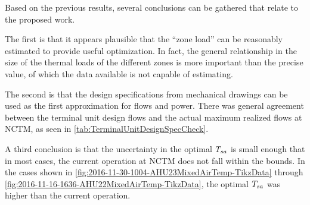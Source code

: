 Based on the previous results, several conclusions can be gathered that
relate to the proposed work.

The first is that it appears plausible that the ``zone load'' can be
reasonably estimated to provide useful optimization.  In fact, the
general relationship in the size of the thermal loads of the different
zones is more important than the precise value, of which the data
available is not capable of estimating. 

The second is that the design specifications from mechanical drawings
can be used as the first approximation for flows and power.  There was
general agreement between the terminal unit design flows and the actual
maximum realized flows at NCTM, as seen in \tableref{}
\ref{tab:TerminalUnitDesignSpecCheck}. 

A third conclusion is that the uncertainty in the optimal \(T_{sa}\) is
small enough that in most cases, the current operation at NCTM does not
fall within the bounds.  In the cases shown in \figref{}
\ref{fig:2016-11-30-1004-AHU23MixedAirTemp-TikzData} through \figref{}
\ref{fig:2016-11-16-1636-AHU22MixedAirTemp-TikzData}, the optimal
\(T_{sa}\) was higher than the current operation. 
